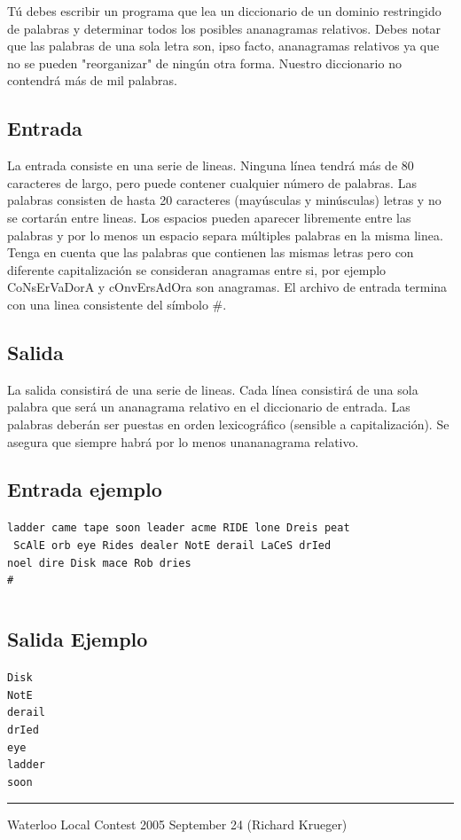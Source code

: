 \documentclass[letter,10pt]{article}
\newcommand{\lyxaddress}[1]{
\par {\raggedright #1
\vspace{1.4em}
\noindent\par}
}
\begin{document}
Tú debes escribir un programa que lea un diccionario de un
dominio restringido de palabras y determinar todos los posibles
ananagramas relativos. Debes notar que las palabras de una sola
letra son, ipso facto, ananagramas relativos ya que no se pueden 
"reorganizar" de ningún otra forma. Nuestro diccionario no 
contendrá más de mil palabras. 

\subsection*{Entrada}

La entrada consiste en una serie de lineas. Ninguna línea
tendrá más de 80 caracteres de largo, pero puede contener
cualquier número de palabras. Las palabras consisten de 
hasta 20 caracteres (mayúsculas y minúsculas) letras y no se cortarán
entre lineas. Los espacios pueden aparecer libremente 
entre las palabras y por lo menos un espacio separa múltiples
palabras en la misma linea. Tenga en cuenta que las palabras
que contienen las mismas letras pero con diferente capitalización
se consideran anagramas entre si, por ejemplo CoNsErVaDorA y 
cOnvErsAdOra son anagramas. El archivo de entrada termina
con una linea consistente del símbolo \#.

\subsection*{Salida}

La salida consistirá de una serie de lineas. Cada línea consistirá
de una sola palabra que será un ananagrama relativo en el diccionario
de entrada. Las palabras deberán ser puestas en orden lexicográfico
(sensible a capitalización). Se asegura que siempre habrá por lo menos
unananagrama relativo.

\subsection*{Entrada ejemplo}
\noindent \texttt{ladder came tape soon leader acme RIDE lone Dreis peat}~\\
\texttt{ ScAlE orb  eye  Rides dealer  NotE derail LaCeS  drIed}~\\
\texttt{noel dire Disk mace Rob dries}~\\
\texttt{\#}~\\
\noindent 

$$$$
$$$$
$$$$
$$$$
$$$$

\subsection*{Salida Ejemplo}

\noindent \texttt{Disk}~\\
\texttt{NotE}~\\
\texttt{derail}~\\
\texttt{drIed}~\\
\texttt{eye}~\\
\texttt{ladder}~\\
\texttt{soon}~\\

\noindent \rule[0.5ex]{1\columnwidth}{1pt}


\lyxaddress{Waterloo Local Contest 2005 September 24 (Richard Krueger)}
\end{document}
